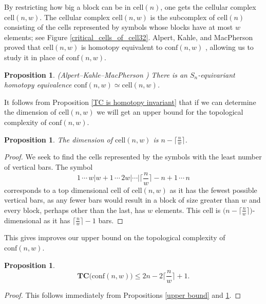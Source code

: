 \documentclass[pagebackref,colorlinks,citecolor=blue,linkcolor=blue,urlcolor=blue,filecolor=blue]{article}
\newtheorem{prop}[thm]{Proposition}
\theoremstyle{definition}\newtheorem{definition}[thm]{Definition}
\theoremstyle{definition}
\begin{document}
By restricting how big a block can be in $\text{cell}(n)$, one gets the cellular complex $\text{cell}(n,w)$.
The cellular complex \emph{$\text{cell}(n,w)$} is the subcomplex of $\text{cell}(n)$ consisting of the cells represented by symbols whose blocks have at most $w$ elements; see Figure \ref{critical_cells_of_cell32}.
Alpert, Kahle, and MacPherson proved that $\text{cell}(n,w)$ is homotopy equivalent to $\text{conf}(n,w)$ \cite[Theorem 3.1]{alpert2021configuration}, allowing us to study it in place of $\text{conf}(n,w)$.

\begin{prop}
(Alpert--Kahle--MacPherson \cite[Theorem 3.1]{alpert2021configuration}) There is an $S_{n}$-equivariant homotopy equivalence $\text{conf}(n,w)\simeq \text{cell}(n,w)$.
\end{prop}

It follows from Proposition \ref{TC is homotopy invariant} that if we can determine the dimension of $\text{cell}(n,w)$ we will get an upper bound for the topological complexity of $\text{conf}(n,w)$.

\begin{prop}\label{dimension of cell(n,w)}
The dimension of $\text{cell}(n,w)$ is $n-\big\lceil\frac{n}{w}\big\rceil$.
\end{prop}

\begin{proof}
We seek to find the cells represented by the symbols with the least number of vertical bars.
The symbol 
\[
1\,\cdots\, w \Big| w+1\, \cdots\, 2w \Big|\cdots\Big| \Big\lceil\frac{n}{w}\Big\rceil-n+1\,\cdots\, n
\]
corresponds to a top dimensional cell of $\text{cell}(n,w)$ as it has the fewest possible vertical bars, as any fewer bars would result in a block of size greater than $w$ and every block, perhaps other than the last, has $w$ elements.
This cell is $\big(n-\big\lceil\frac{n}{w}\big\rceil\big)$-dimensional as it has $\big\lceil\frac{n}{w}\big\rceil-1$ bars.
\end{proof}

This gives improves our upper bound on the topological complexity of $\text{conf}(n,w)$.

\begin{prop}\label{upper bound for top complex of conf(n,w)}
\[
\textbf{TC}\big(\text{conf}(n,w)\big)\le 2n-2\Big\lceil\frac{n}{w}\Big\rceil+1.
\]
\end{prop}

\begin{proof}
This follows immediately from Propositions \ref{upper bound} and \ref{dimension of cell(n,w)}.
\end{proof}
\end{document}
